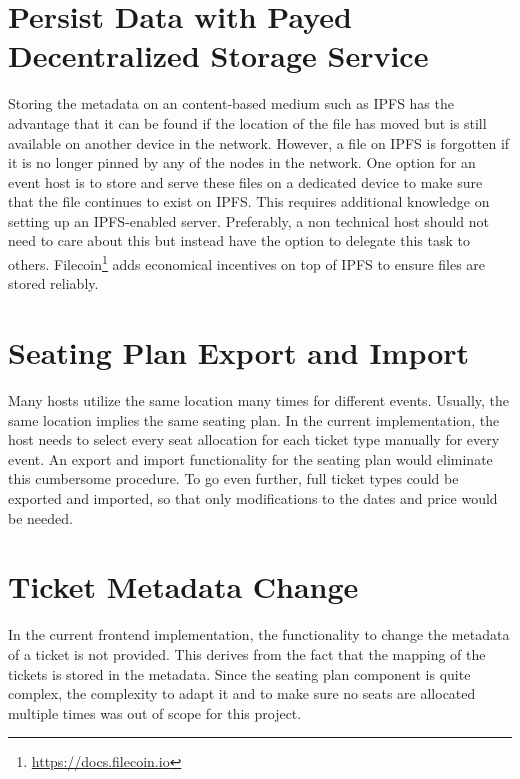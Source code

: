 \section{Persist Data with Payed Decentralized Storage Service}
Storing the metadata on an content-based medium such as IPFS has the advantage that it can be found if the location of the file has moved but is still available on another device in the network. However, a file on IPFS is forgotten if it is no longer pinned by any of the nodes in the network. One option for an event host is to store and serve these files on a dedicated device to make sure that the file continues to exist on IPFS. This requires additional knowledge on setting up an IPFS-enabled server. Preferably, a non technical host should not need to care about this but instead have the option to delegate this task to others. Filecoin\footnote{\href{https://docs.filecoin.io}{https://docs.filecoin.io}} adds economical incentives on top of IPFS to ensure files are stored reliably.

\section{Seating Plan Export and Import}
Many hosts utilize the same location many times for different events. Usually, the same location implies the same seating plan. In the current implementation, the host needs to select every seat allocation for each ticket type manually for every event. An export and import functionality for the seating plan would eliminate this cumbersome procedure. To go even further, full ticket types could be exported and imported, so that only modifications to the dates and price would be needed.

\section{Ticket Metadata Change}
\label{future-work-ticket-metadata-change}
In the current frontend implementation, the functionality to change the metadata of a ticket is not provided. This derives from the fact that the mapping of the tickets is stored in the metadata. Since the seating plan component is quite complex, the complexity to adapt it and to make sure no seats are allocated multiple times was out of scope for this project.


